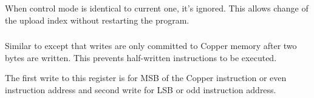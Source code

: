 When control mode is identical to current one, it's ignored. This allows change of the upload index without restarting the program.


\subsubsection{}

\begin{NextPort}
\end{NextPort}

Similar to  except that writes are only committed to Copper memory after two bytes are written. This prevents half-written instructions to be executed.

The first write to this register is for MSB of the Copper instruction or even instruction address and second write for LSB or odd instruction address.


\pagebreak
\IntentionallyEmpty
\pagebreak
